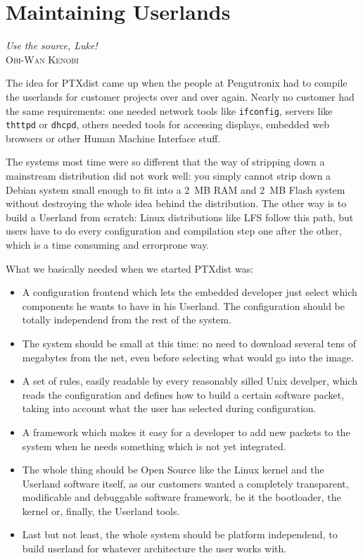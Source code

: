 \chapter{Maintaining Userlands} 		\label{chap:userlands}

\begin{flushright}
\emph{
Use the source, Luke!\\
}
\textsc{\small Obi-Wan Kenobi}
\end{flushright}

The idea for PTXdist came up when the people at Pengutronix had to
compile the userlands for customer projects over and over again. Nearly
no customer had the same requirements: one needed network tools like
\texttt{ifconfig}, servers like \texttt{thttpd} or \texttt{dhcpd},
others needed tools for accessing displays, embedded web browsers or
other Human Machine Interface stuff. 

The systems most time were so different that the way of stripping down a
mainstream distribution did not work well: you simply cannot strip down
a Debian system small enough to fit into a 2~MB RAM and 2~MB Flash
system without destroying the whole idea behind the distribution. The
other way is to build a Userland from scratch: Linux distributions like
LFS follow this path, but users have to do every configuration and
compilation step one after the other, which is a time consuming and
errorprone way. 

What we basically needed when we started PTXdist was: 
\begin{itemize}
\item A configuration frontend which lets the embedded developer just
      select which components he wants to have in his Userland. The
      configuration should be totally independend from the rest of the
      system. 
\item The system should be small at this time: no need to download
      several tens of megabytes from the net, even before selecting what
      would go into the image.
\item A set of rules, easily readable by every reasonably silled Unix
      develper, which reads the configuration and defines how to 
      build a certain software packet, taking into account what the 
      user has selected during configuration. 
\item A framework which makes it easy for a developer to add new packets
      to the system when he needs something which is not yet integrated. 
\item The whole thing should be Open Source like the Linux kernel and
      the Userland software itself, as our customers wanted a completely
      transparent, modificable and debuggable software framework, be it 
      the bootloader, the kernel or, finally, the Userland tools. 
\item Last but not least, the whole system should be platform
      independend, to build userland for whatever architecture the 
      user works with. 
\end{itemize}

